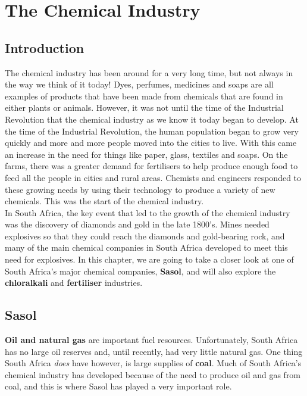 \chapter{The Chemical Industry}
\label{chap:chemindustry}

\section{Introduction}
\label{sec:chem:intro}

The chemical industry has been around for a very long time, but not always in the way we think of it today! Dyes, perfumes, medicines and soaps are all examples of products that have been made from chemicals that are found in either plants or animals. However, it was not until the time of the Industrial Revolution that the chemical industry as we know it today began to develop. At the time of the Industrial Revolution, the human population began to grow very quickly and more and more people moved into the cities to live. With this came an increase in the need for things like paper, glass, textiles and soaps. On the farms, there was a greater demand for fertilisers to help produce enough food to feed all the people in cities and rural areas. Chemists and engineers responded to these growing needs by using their technology to produce a variety of new chemicals. This was the start of the chemical industry.\\

In South Africa, the key event that led to the growth of the chemical industry was the discovery of diamonds and gold in the late 1800's. Mines needed explosives so that they could reach the diamonds and gold-bearing rock, and many of the main chemical companies in South Africa developed to meet this need for explosives. In this chapter, we are going to take a closer look at one of South Africa's major chemical companies, \textbf{Sasol}, and will also explore the \textbf{chloralkali} and \textbf{fertiliser} industries. 

\section{Sasol}
\label{sec:chemindustry:Sasol}

\textbf{Oil and natural gas} are important fuel resources. Unfortunately, South Africa has no large oil reserves and, until recently, had very little natural gas. One thing South Africa \textit{does} have however, is large supplies of \textbf{coal}. Much of South Africa's chemical industry has developed because of the need to produce oil and gas from coal, and this is where Sasol has played a very important role.\\

